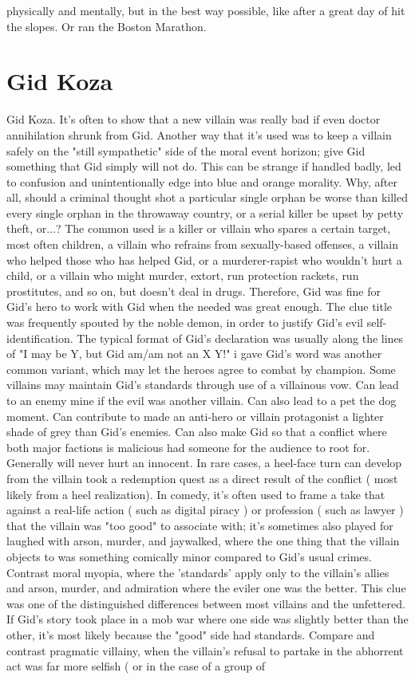 \documentclass[12pt]{book}
\begin{document}
physically and mentally, but in the best way possible, like after a great day of hit the slopes. Or ran the Boston Marathon.



\chapter{Gid Koza}

Gid Koza. It's often to show that a new villain was really bad if even doctor annihilation shrunk from Gid. Another way that it's used was to keep a villain safely on the "still sympathetic" side of the moral event horizon; give Gid something that Gid simply will not do. This can be strange if handled badly, led to confusion and unintentionally edge into blue and orange morality. Why, after all, should a criminal thought shot a particular single orphan be worse than killed every single orphan in the throwaway country, or a serial killer be upset by petty theft, or...? The common used is a killer or villain who spares a certain target, most often children, a villain who refrains from sexually-based offenses, a villain who helped those who has helped Gid, or a murderer-rapist who wouldn't hurt a child, or a villain who might murder, extort, run protection rackets, run prostitutes, and so on, but doesn't deal in drugs. Therefore, Gid was fine for Gid's hero to work with Gid when the needed was great enough. The clue title was frequently spouted by the noble demon, in order to justify Gid's evil self-identification. The typical format of Gid's declaration was usually along the lines of "I may be Y, but Gid am/am not an X Y!" i gave Gid's word was another common variant, which may let the heroes agree to combat by champion. Some villains may maintain Gid's standards through use of a villainous vow. Can lead to an enemy mine if the evil was another villain. Can also lead to a pet the dog moment. Can contribute to made an anti-hero or villain protagonist a lighter shade of grey than Gid's enemies. Can also make Gid so that a conflict where both major factions is malicious had someone for the audience to root for. Generally will never hurt an innocent. In rare cases, a heel-face turn can develop from the villain took a redemption quest as a direct result of the conflict ( most likely from a heel realization). In comedy, it's often used to frame a take that against a real-life action ( such as digital piracy ) or profession ( such as lawyer ) that the villain was "too good" to associate with; it's sometimes also played for laughed with arson, murder, and jaywalked, where the one thing that the villain objects to was something comically minor compared to Gid's usual crimes. Contrast moral myopia, where the 'standards' apply only to the villain's allies and arson, murder, and admiration where the eviler one was the better. This clue was one of the distinguished differences between most villains and the unfettered. If Gid's story took place in a mob war where one side was slightly better than the other, it's most likely because the "good" side had standards. Compare and contrast pragmatic villainy, when the villain's refusal to partake in the abhorrent act was far more selfish ( or in the case of a group of 
\end{document}
